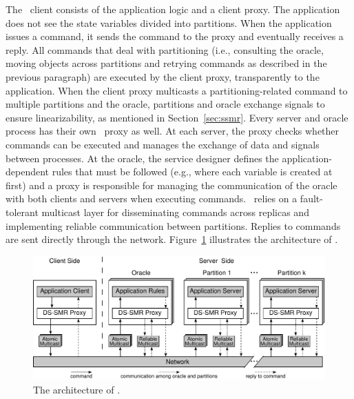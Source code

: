 The \dssmr\ client consists of the application logic and a client proxy.
The application does not see the state variables divided into partitions. When
the application issues a command, it sends the command to the proxy and
eventually receives a reply. All commands that deal with partitioning (i.e.,
consulting the oracle, moving objects across partitions and retrying commands as
described in the previous paragraph) are executed by the client proxy,
transparently to the application. When the client proxy multicasts a
partitioning-related command to multiple partitions and the oracle, partitions
and oracle exchange signals to ensure linearizability, as mentioned in
Section~\ref{sec:ssmr}. Every server and oracle process has their own \dssmr\
proxy as well. At each server, the proxy checks whether commands can be executed
and manages the exchange of data and signals between processes. At the oracle,
the service designer defines the application-dependent rules that must be
followed (e.g., where each variable is created at first) and a proxy is
responsible for managing the communication of the oracle with both clients and
servers when executing commands. \dssmr\ relies on a fault-tolerant multicast
layer for disseminating commands across replicas and implementing reliable
communication between partitions. Replies to commands are sent directly through
the network. Figure~\ref{fig:dssmr-arch} illustrates the architecture of \dssmr{}.

\begin{figure}
\begin{minipage}[b]{1.0\linewidth}
\centering
      \includegraphics[width=0.8\linewidth]{figures/dssmr-arch}
\end{minipage}
\caption{The architecture of \dssmrlong{}.}
\label{fig:dssmr-arch}
\end{figure}

